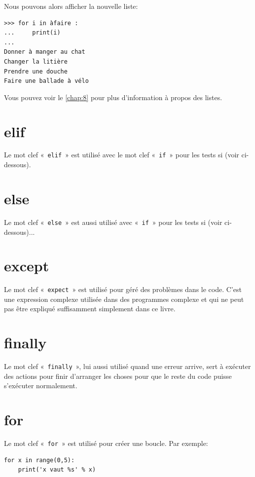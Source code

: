 Nous pouvons alors afficher la nouvelle liste:
\begin{Verbatim}[frame=single,rulecolor=\color{gray}]
>>> for i in àfaire :
...     print(i)
...
Donner à manger au chat
Changer la litière
Prendre une douche
Faire une ballade à vélo
\end{Verbatim}

Vous pouvez voir le \autoref{chap:8} pour plus d'information à propos des listes.

\section*{elif}

Le mot clef «~\texttt{elif}~» est utilisé avec le mot clef «~\texttt{if}~» pour les tests si (voir ci-dessous). 

\section*{else}

Le mot clef «~\texttt{else}~» est aussi utilisé avec «~\texttt{if}~» pour les tests si (voir ci-dessous)...

\section*{except}

Le mot clef «~\texttt{expect}~» est utilisé pour géré des problèmes dans le code. C'est une expression complexe utilisée dans des programmes complexe et qui ne peut pas être expliqué suffisamment simplement dans ce livre. 


\section*{finally}

Le mot clef «~\texttt{finally}~», lui aussi utilisé quand une erreur arrive, sert à exécuter des actions pour finir d'arranger les choses pour que le reste du code puisse s'exécuter normalement.

\section*{for}

Le mot clef «~\texttt{for}~» est utilisé pour créer une boucle. Par exemple:
\begin{Verbatim}[frame=single,rulecolor=\color{gray}]
for x in range(0,5):
    print('x vaut %s' % x)
\end{Verbatim}

